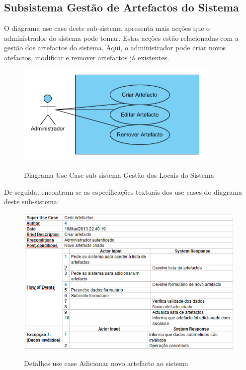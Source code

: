 \documentclass[12pt,a4paper]{article}
\begin{document}
\clearpage

\subsection{Subsistema Gestão de Artefactos do Sistema}

O diagrama use case deste sub-sistema apresenta mais acções que o administrador do sistema
pode tomar. Estas acções estão relacionadas com a gestão dos artefactos do sistema. Aqui, o
administrador pode criar novos atefactos, modificar e remover artefactos já existentes.\\

\begin{figure}[h!]
\centering
\includegraphics[scale=1]{usecase/A_GerarArtefactos}
\label{usecase}
\caption{Diagrama Use Case sub-sistema Gestão dos Locais do Sistema}
\end{figure}

De seguida, encontram-se as especificações textuais dos use cases do diagrama deste sub-sistema:\\

\begin{figure}[h!]
\centering
\includegraphics[scale=0.7]{d_usecase/A_criarartefacto}
\label{usecase}
\caption{Detalhes use case Adicionar novo artefacto ao sistema}
\end{figure}
\end{document}
